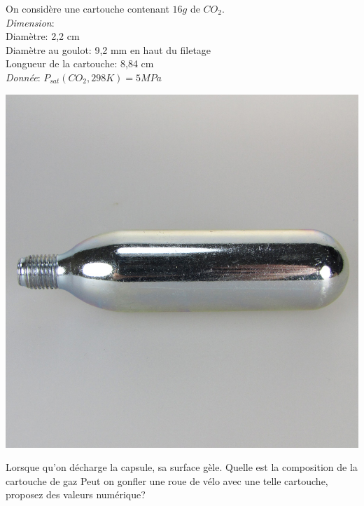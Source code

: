 \begin{Exercise}[title=Cartouche pour vélo]
  \begin{minipage}{0.7\linewidth}
    On considère une cartouche  contenant $16 g$ de $CO_2$.\\
    \emph{Dimension}: \\
    Diamètre: 2,2 cm \\
    Diamètre au goulot: 9,2 mm en haut du filetage \\
    Longueur de la cartouche: 8,84 cm \\
    \emph{Donnée}:
    $P_{sat}(CO_{2},298K) = 5MPa$
    
  \end{minipage}\hspace{.05\linewidth}
  \begin{minipage}{0.2\textwidth}
    \includegraphics[width=\linewidth]{../fig/cartouche.jpg}
  \end{minipage}

  Lorsque qu'on décharge la capsule, sa surface gèle.
  \Question Quelle est la composition de la cartouche de gaz
  \Question Peut on gonfler une roue de vélo avec une telle cartouche, proposez des valeurs numérique?
\end{Exercise}
